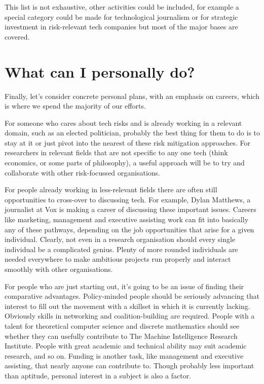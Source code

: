 \documentclass[12pt]{article}
\begin{document}
This list is not exhaustive, other activities could be included, for example a special category could be made for technological journalism or for strategic investment in risk-relevant tech companies but most of the major bases are covered.

\section{What can I personally do?}
Finally, let's consider concrete personal plans, with an emphasis on careers, which is where we spend the majority 
of our efforts.

For someone who cares about tech risks and is already working in a relevant domain, such as an elected politician,
probably the best thing for them to do is to stay at it or just pivot into the nearest of these risk mitigation 
approaches. For researchers in relevant fields that are not specific to any one tech (think economics, or some 
parts of philosophy), a useful approach will be to try and collaborate with other risk-focussed organisations.

For people already working in less-relevant fields there are often still opportunities to cross-over to discussing tech. 
For example, Dylan Matthews, a journalist at Vox is making a career of discussing these important issues. Careers 
like marketing, management and executive assisting work can fit into basically any of these pathways, depending 
on the job opportunities that arise for a given individual. Clearly, not even in a research organisation should 
every single individual be a complicated genius. Plenty of more rounded individuals are needed everywhere to 
make ambitious projects run properly and interact smoothly with other organisations.

For people who are just starting out, it's going to be an issue of finding their comparative advantages. 
Policy-minded people should be seriously advancing that interest to fill out the movement with a skillset in 
which it is currently lacking. Obviously skills in networking and coalition-building are 
required. People with a talent for theoretical computer science and discrete mathematics 
should see whether they can usefully contribute to The Machine Intelligence Research 
Institute. People with great academic and technical ability may suit academic research, 
and so on. Funding is another task, like management and executive assisting, 
that nearly anyone can contribute to. Though probably less important than aptitude, personal 
interest in a subject is also a factor.
\end{document}
